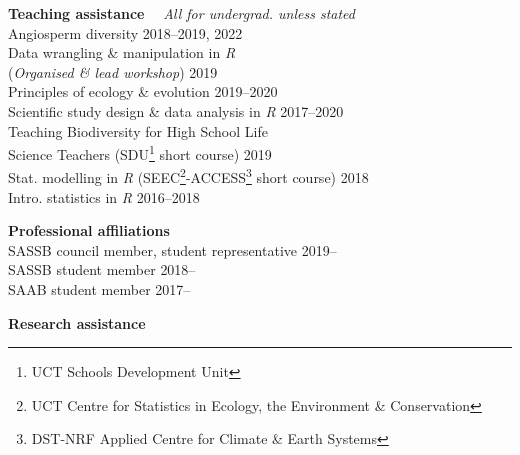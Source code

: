 \documentclass[10pt]{article}
\begin{document}
\begin{multicols}{2}
\columnbreak

\textbf{Teaching assistance} %
  ~~{\small \textmd{\textit{All for undergrad. unless stated}}}\\

Angiosperm diversity                         \hfill {\small 2018--2019, 2022} \\
Data wrangling \& manipulation in \textit{R} \\
\hspace{2em} (\textit{Organised \& lead
  workshop})                                 \hfill {\small             2019} \\
Principles of ecology \& evolution           \hfill {\small       2019--2020} \\
Scientific study design \& data analysis in
  \textit{R}                                 \hfill {\small       2017--2020} \\
Teaching Biodiversity for High School Life \\
\hspace{2em} Science Teachers {\small
  (SDU\footnote{UCT Schools Development Unit}
  short course)}                             \hfill {\small             2019} \\
Stat. modelling in \textit{R} {\small
  (SEEC\footnote{UCT Centre for Statistics in
  Ecology, the Environment \&
  Conservation}-ACCESS\footnote{DST-NRF
  Applied Centre for Climate \& Earth Systems}
  short course)}                             \hfill {\small             2018} \\
Intro. statistics in \textit{R}              \hfill {\small       2016--2018}

\textbf{Professional affiliations}\\ %

SASSB council member, student representative           \hfill {\small 2019--} \\
SASSB student member                                   \hfill {\small 2018--} \\
SAAB student member                                    \hfill {\small 2017--}

\end{multicols}

\textbf{Research assistance}\\ %
\end{document}
